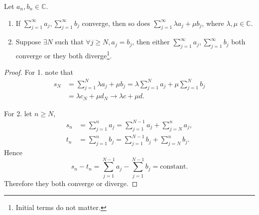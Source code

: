 \begin{lemma}\label{lma:1.6} 
    Let $ a_n,b_n\in \mathbb{C} $.
    \begin{enumerate}
        \item If $\displaystyle \sum_{j=1}^{\infty}a_j,\sum_{j=1}^{\infty}b_j$ converge, then so does $\displaystyle \sum_{j=1}^{\infty}\lambda a_j+\mu b_j$, where $ \lambda,\mu\in \mathbb{C} $.
        \item Suppose $ \exists N $ such that $ \forall j\ge N, a_j=b_j $, then either $\displaystyle \sum_{j=1}^{\infty}a_j,\sum_{j=1}^{\infty}b_j$ both converge or they both diverge\footnote{Initial terms do not matter.}.
    \end{enumerate}
\end{lemma}
\begin{proof}
    For 1. note that 
    \begin{align*}
        s_N &= \sum_{j=1}^{N}\lambda a_j+\mu b_j = \lambda \sum_{j=1}^{N}a_j + \mu \sum_{j=1}^{N}b_j\\ 
        &= \lambda c_N + \mu d_N \to \lambda c+ \mu d.
    \end{align*}

    For 2. let $n\ge N$,
    \begin{align*}
        s_n &= \sum_{j=1}^{n} a_j = \sum_{j=1}^{N-1}a_j+\sum_{j=N}^{n}a_j,\\ 
        t_n &= \sum_{j=1}^{n} b_j = \sum_{j=1}^{N-1}b_j+\sum_{j=N}^{n}b_j.
    \end{align*}
    Hence 
    \[
        s_n-t_n = \sum_{j=1}^{N-1}a_j-\sum_{j=1}^{N-1}b_j=\text{constant}.
    \]
    Therefore they both converge or diverge.
\end{proof}